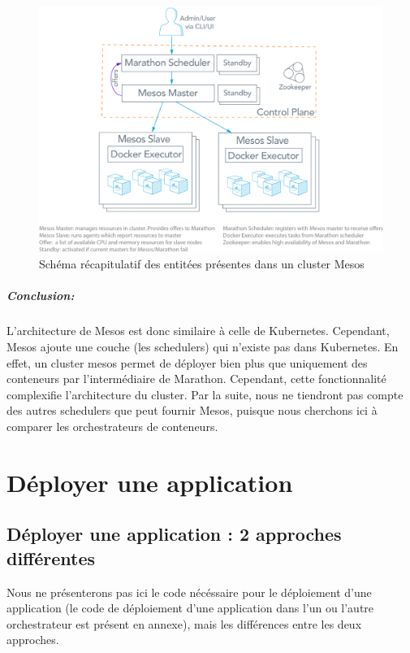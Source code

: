 \documentclass[11pt,fleqn]{book} %
\begin{document}
\begin{figure}[H]\centering
\renewcommand{\figurename}{Graphique}
\includegraphics[scale=0.3,trim={0 5cm 0 0},clip]{Pictures/Comparaison/mesos-architecture.png}
\captionsetup{margin=1.5cm,format=hang,justification=justified}
\caption[]{Schéma récapitulatif des entitées présentes dans un cluster Mesos \newline}
\end{figure}

\begin{interrupt}
\paragraph{Conclusion:}
L'architecture de Mesos est donc similaire à celle de Kubernetes. Cependant, Mesos ajoute une couche (les schedulers) qui n'existe pas dans Kubernetes. En effet, un cluster mesos permet de déployer bien plus que uniquement des conteneurs par l'intermédiaire de Marathon. Cependant, cette fonctionnalité complexifie l'architecture du cluster. Par la suite, nous ne tiendront pas compte des autres schedulers que peut fournir Mesos, puisque nous cherchons ici à comparer les orchestrateurs de conteneurs.  
\end{interrupt}
\chapter{Déployer une application}
\vspace{-2cm}

\section{Déployer une application : 2 approches différentes}
Nous ne présenterons pas ici le code nécéssaire pour le déploiement d'une application (le code de déploiement d'une application dans l'un ou l'autre orchestrateur est présent en annexe), mais les différences entre les deux approches.\\
\end{document}
